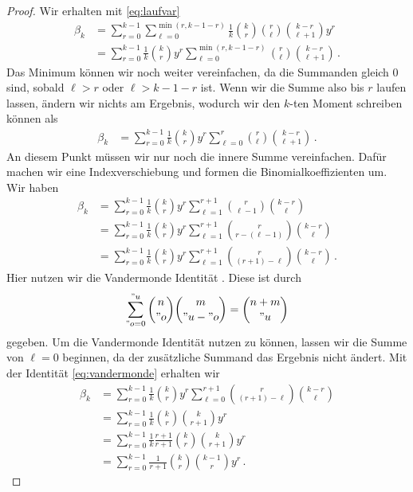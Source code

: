 \documentclass[../Bachelor_LennartKoliwer.tex]{subfiles}
\begin{document}
\begin{proof}
    Wir erhalten mit \eqref{eq:laufvar}
    \begin{align*}
        \beta_k &= \sum_{r=0}^{k-1}\sum_{\ell=0}^{\min(r,k-1-r)} \frac1k\binom{k}{r} \binom{r}{\ell} \binom{k-r}{\ell+1} y^{r}\\
        &= \sum_{r=0}^{k-1} \frac1k\binom{k}{r} y^{r}\sum_{\ell=0}^{\min(r,k-1-r)} \binom{r}{\ell} \binom{k-r}{\ell+1}\,.
    \end{align*}
    Das Minimum können wir noch weiter vereinfachen, da die Summanden gleich $0$ sind, sobald $\ell>r$ oder $\ell>k-1-r$ ist. 
    Wenn wir die Summe also bis $r$ laufen lassen, ändern wir nichts am Ergebnis, wodurch wir den $k$-ten Moment schreiben können als
    \begin{align*}
        \beta_k &= \sum_{r=0}^{k-1} \frac1k\binom{k}{r} y^{r}\sum_{\ell=0}^{r} \binom{r}{\ell} \binom{k-r}{\ell+1}\,.
    \end{align*}
    An diesem Punkt müssen wir nur noch die innere Summe vereinfachen. 
    Dafür machen wir eine Indexverschiebung und formen die Binomialkoeffizienten um. 
    Wir haben
    \begin{align*}
        \beta_k &= \sum_{r=0}^{k-1} \frac1k\binom{k}{r} y^{r}\sum_{\ell=1}^{r+1} \binom{r}{\ell-1} \binom{k-r}{\ell} \\
        &= \sum_{r=0}^{k-1} \frac1k\binom{k}{r} y^{r}\sum_{\ell=1}^{r+1} \binom{r}{r-(\ell-1)} \binom{k-r}{\ell} \\
        &= \sum_{r=0}^{k-1} \frac1k\binom{k}{r} y^{r}\sum_{\ell=1}^{r+1} \binom{r}{(r+1)-\ell} \binom{k-r}{\ell}\,.
    \end{align*}
    Hier nutzen wir die Vandermonde Identität \cite[16]{Diskrete}.
    Diese ist durch
    \begin{align}
        \sum_{"o=0}^{"u}\binom{n}{"o}\binom{m}{"u-"o}=\binom{n+m}{"u} \label{eq:vandermonde}
    \end{align} 
    gegeben.
    Um die Vandermonde Identität nutzen zu können, lassen wir die Summe von $\ell=0$ beginnen, da der zusätzliche Summand das Ergebnis nicht ändert. 
    Mit der Identität \eqref{eq:vandermonde} erhalten wir
    \begin{align*}
        \beta_k &= \sum_{r=0}^{k-1} \frac1k\binom{k}{r} y^{r}\sum_{\ell=0}^{r+1} \binom{r}{(r+1)-\ell} \binom{k-r}{\ell}\\
        &= \sum_{r=0}^{k-1} \frac1k\binom{k}{r}\binom{k}{r+1} y^{r}\\
        &= \sum_{r=0}^{k-1} \frac1k\frac{r+1}{r+1}\binom{k}{r}\binom{k}{r+1} y^{r} \\
        &= \sum_{r=0}^{k-1} \frac{1}{r+1}\binom{k}{r}\binom{k-1}{r} y^{r}\,.
    \end{align*}
\end{proof}
\end{document}
